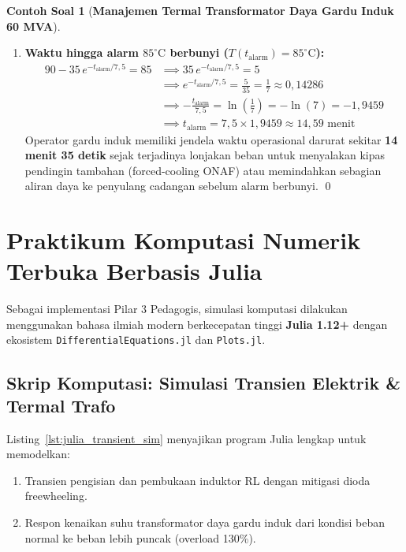\documentclass[11pt,a4paper]{article}
\theoremstyle{definition}
\newtheorem{example}{Contoh Soal}[section]
\begin{document}
\begin{example}[\textbf{Manajemen Termal Transformator Daya Gardu Induk 60 MVA}]
\begin{enumerate}[label=(\alph*), leftmargin=*]
    \item \textbf{Waktu hingga alarm $85^\circ\text{C}$ berbunyi ($T(t_{\text{alarm}}) = 85^\circ\text{C}$):}
    \begin{align*}
        90 - 35 \, e^{-t_{\text{alarm}}/7{,}5} = 85 &\implies 35 \, e^{-t_{\text{alarm}}/7{,}5} = 5 \\
        &\implies e^{-t_{\text{alarm}}/7{,}5} = \frac{5}{35} = \frac{1}{7} \approx 0{,}14286 \\
        &\implies -\frac{t_{\text{alarm}}}{7{,}5} = \ln\left(\frac{1}{7}\right) = -\ln(7) = -1{,}9459 \\
        &\implies t_{\text{alarm}} = 7{,}5 \times 1,9459 \approx 14{,}59\text{ menit}
    \end{align*}
    Operator gardu induk memiliki jendela waktu operasional darurat sekitar \textbf{14 menit 35 detik} sejak terjadinya lonjakan beban untuk menyalakan kipas pendingin tambahan (forced-cooling ONAF) atau memindahkan sebagian aliran daya ke penyulang cadangan sebelum alarm berbunyi. \qed
\end{enumerate}
\end{example}

\section{Praktikum Komputasi Numerik Terbuka Berbasis Julia}

Sebagai implementasi Pilar 3 Pedagogis, simulasi komputasi dilakukan menggunakan bahasa ilmiah modern berkecepatan tinggi \textbf{Julia 1.12+} dengan ekosistem \texttt{DifferentialEquations.jl} dan \texttt{Plots.jl}.

\subsection{Skrip Komputasi: Simulasi Transien Elektrik \& Termal Trafo}

Listing~\ref{lst:julia_transient_sim} menyajikan program Julia lengkap untuk memodelkan:
\begin{enumerate}[leftmargin=*]
    \item Transien pengisian dan pembukaan induktor RL dengan mitigasi dioda freewheeling.
    \item Respon kenaikan suhu transformator daya gardu induk dari kondisi beban normal ke beban lebih puncak (overload 130\%).
\end{enumerate}
\end{document}
